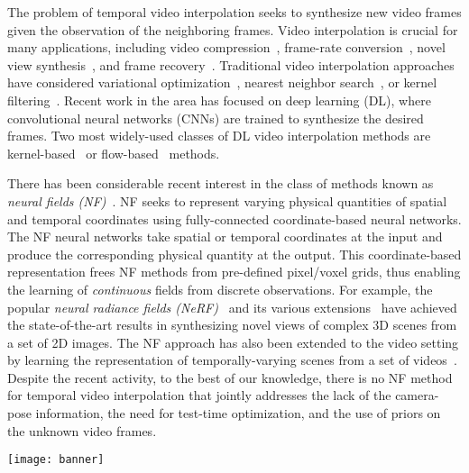 \documentclass[12pt]{article}
\def\proposed{CURE}
\begin{document}
The problem of temporal video interpolation seeks to synthesize new video frames given the observation of the neighboring frames. Video interpolation is crucial for many applications, including video compression~\cite{Lu.etal2017},  frame-rate conversion~\cite{Castagno.etal1996}, novel view synthesis~\cite{Flynn.etal2016}, and frame recovery~\cite{Wu.etal2015}. Traditional video interpolation approaches have considered variational optimization~\cite{Brox.etal2004}, nearest neighbor search~\cite{Chen2013}, or kernel filtering~\cite{Takeda.etal2008}. Recent work in the area has focused on deep learning (DL), where convolutional neural networks (CNNs) are trained to synthesize the desired frames. Two most widely-used classes of DL video interpolation methods are kernel-based~\cite{Niklaus.etal2017a,Niklaus.etal2017b,niklaus2021revisiting} or flow-based~\cite{Ren.etal2017,Ranjan.etal2017,Liu.etal2017video,Hui.etal2018,Xue.etal2019,Teed.etal2020,Bao.etal2021} methods. 

There has been considerable recent interest in the class of methods known as \emph{neural fields (NF)}~\cite{Sitzmann.etal2019,Park.etal2019}. NF seeks to represent varying physical quantities of spatial and temporal coordinates using fully-connected coordinate-based neural networks. The NF neural networks take spatial or temporal coordinates at the input and produce the corresponding physical quantity at the output. This coordinate-based representation frees NF methods from pre-defined pixel/voxel grids, thus enabling the learning of \emph{continuous} fields from discrete observations. For example, the popular \emph{neural radiance fields (NeRF)}~\cite{Mildenhall.etal2020} and its various extensions~\cite{Liu.etal2020voxel,Martin.etal2020} have achieved the state-of-the-art results in synthesizing novel views of complex 3D scenes from a set of 2D images. The NF approach has also been extended to the video setting by learning the representation of temporally-varying scenes from a set of videos~\cite{Li.etal2020neural,Du.etal2021,Xian.etal2020,Peng.etal2021,Li.etal2021neural}. Despite the recent activity, to the best of our knowledge, there is no NF method for temporal video interpolation that jointly addresses the lack of the camera-pose information, the need for test-time optimization, and the use of priors on the unknown video frames.

\begin{figure*}[t!]
\centering
\texttt{[image: banner]}
\caption{Visual illustration of a frame interpolated by \proposed, NSFF~\cite{li2021neural}, and AMBE~\cite{park2021asymmetric}. NSFF and AMBE are the state-of-the-art methods for dynamic-scene view synthesis and video interpolation, respectively. Note how \proposed~substantially improves the visual quality and reduces the residual error in the second row.}
\label{fig:banner}
\end{figure*}
\end{document}
